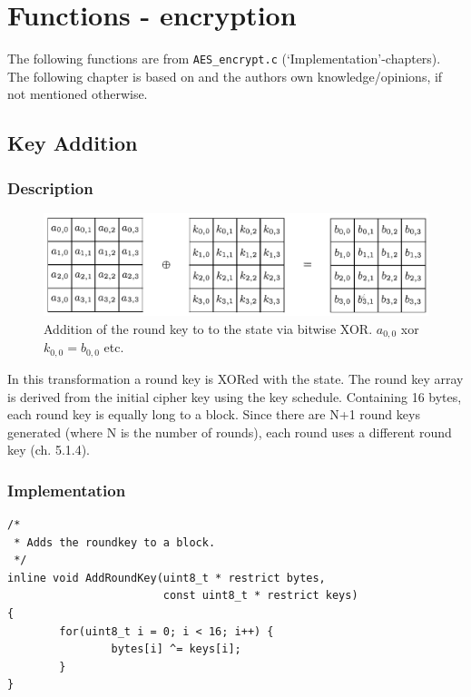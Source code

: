 \hypertarget{functions---Encryption}{%
\chapter{Functions - encryption}\label{functions---encryption}}

The following functions are from \lstinline|AES_encrypt.c|
(`Implementation'-chapters). The following chapter is based on \cite{aes2001} and the authors own
knowledge/opinions, if not mentioned otherwise.

\hypertarget{key-addition}{%
\section{Key Addition}\label{key-addition}}

\hypertarget{description-2}{%
\subsection{Description}\label{description-2}}

\begin{figure}
\centering
\includegraphics[scale = 0.3]{data/figures/addroundkey.png}
\caption{Addition of the round key to to the state via bitwise XOR. $a_{0,0}$ xor $k_{0,0} = b_{0,0}$ etc.}
\end{figure}

In this transformation a round key is
XORed with the state. The round key array is
derived from the initial cipher key using the key schedule. Containing
16 bytes, each round key is equally long to a block. Since there are N+1
round keys generated (where N is the number of rounds), each round uses
a different round key (ch. 5.1.4).

\hypertarget{implementation-2}{%
\subsection{Implementation}\label{implementation-2}}

\begin{lstlisting}
/*
 * Adds the roundkey to a block.
 */
inline void AddRoundKey(uint8_t * restrict bytes,
                        const uint8_t * restrict keys)
{
        for(uint8_t i = 0; i < 16; i++) {
                bytes[i] ^= keys[i];
        }
}
\end{lstlisting}

